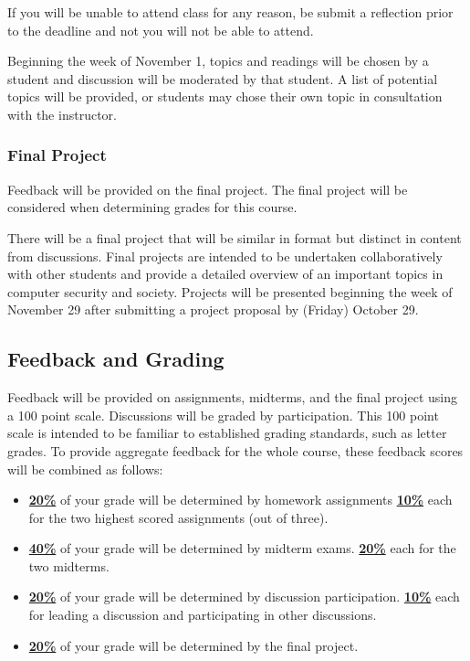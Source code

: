 \documentclass[11pt]{article}
\begin{document}
\bigskip
\noindent If you will be unable to attend class for any reason, be submit a reflection prior to the deadline and not you will not be able to attend.

\bigskip
\noindent Beginning the week of November 1, topics and readings will be chosen by a student and discussion will be moderated by that student. A list of potential topics will be provided, or students may chose their own topic in consultation with the instructor.

\subsubsection*{Final Project}

Feedback will be provided on the final project. The final project will be considered when determining grades for this course.

There will be a final project that will be similar in format but distinct in content from
discussions. Final projects are intended to be undertaken collaboratively with other 
students and provide a detailed overview of an important topics in computer security and 
society. Projects will be presented beginning the week of November 29 after submitting a 
project proposal by (Friday) October 29.


\subsection*{Feedback and Grading}
Feedback will be provided on assignments, midterms, and the final project using a 100 point scale.
Discussions will be graded by participation.
This 100 point scale is intended to be familiar to established grading standards, such as letter grades. To provide aggregate feedback for the whole course, these feedback scores will be combined as follows:
\begin{itemize}
	\item \underline{\textbf{20\%}} of your grade will be determined by homework assignments
	\subitem \underline{\textbf{10\%}} each for the two highest scored assignments (out of three).
	\item \underline{\textbf{40\%}} of your grade will be determined by midterm exams.
	\subitem \underline{\textbf{20\%}} each for the two midterms.
	\item \underline{\textbf{20\%}} of your grade will be determined by discussion participation.
	\subitem \underline{\textbf{10\%}} each for leading a discussion and participating in other discussions.
	\item \underline{\textbf{20\%}} of your grade will be determined by the final project.
\end{itemize}
\end{document}
